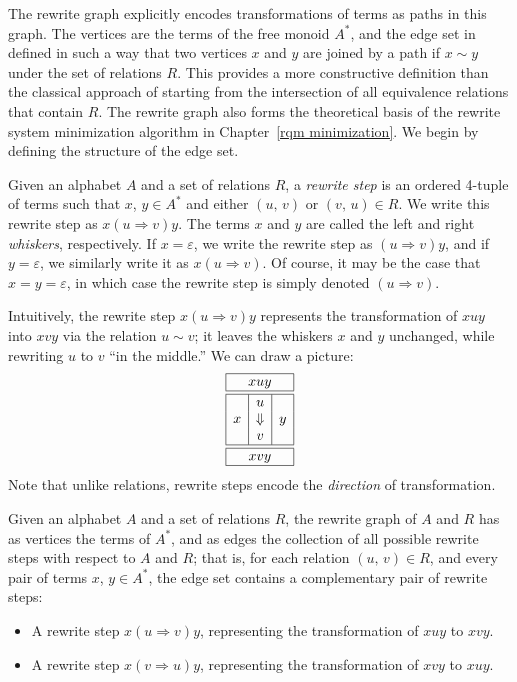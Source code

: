 \documentclass[../generics]{subfiles}
\begin{document}
The rewrite graph explicitly encodes transformations of terms as paths in this graph. The vertices are the terms of the free monoid $A^*$, and the edge set in defined in such a way that two vertices $x$ and $y$ are joined by a path if $x\sim y$ under the set of relations $R$. This provides a more constructive definition than the classical approach of starting from the intersection of all equivalence relations that contain $R$. The rewrite graph also forms the theoretical basis of the rewrite system minimization algorithm in Chapter~\ref{rqm minimization}. We begin by defining the structure of the edge set.

\begin{definition}
Given an alphabet $A$ and a set of relations $R$, a \emph{rewrite step} is an ordered 4-tuple of terms such that $x$, $y\in A^*$ and either $(u,\,v)$ or $(v,\,u)\in R$. We write this rewrite step as \index{$\Rightarrow$}$x(u\Rightarrow v)y$. The terms $x$ and $y$ are called the left and right \emph{whiskers}, respectively. If $x=\varepsilon$, we write the rewrite step as $(u\Rightarrow v)y$, and if $y=\varepsilon$, we similarly write it as $x(u\Rightarrow v)$. Of course, it may be the case that $x=y=\varepsilon$, in which case the rewrite step is simply denoted $(u\Rightarrow v)$.
\end{definition}
Intuitively, the rewrite step $x(u\Rightarrow v)y$ represents the transformation of $xuy$ into $xvy$ via the relation $u\sim v$; it leaves the whiskers $x$ and $y$ unchanged, while rewriting $u$ to $v$ ``in the middle.'' We can draw a picture:
\[
\begin{array}{|c|c|c|}
\hline
\multicolumn{3}{|c|}{xuy}\\
\hline
\hline
&u&\\
x&\Downarrow&y\\
&v&\\
\hline
\hline
\multicolumn{3}{|c|}{xvy}\\
\hline
\end{array}
\]
Note that unlike relations, rewrite steps encode the \emph{direction} of transformation.
\begin{definition}
Given an alphabet $A$ and a set of relations $R$, the rewrite graph of $A$ and $R$ has as vertices the terms of $A^*$, and as edges the collection of all possible rewrite steps with respect to $A$ and $R$; that is, for each relation $(u,\,v)\in R$, and every pair of terms $x$, $y\in A^*$, the edge set contains a complementary pair of rewrite steps:
\begin{itemize}
\item A rewrite step $x(u\Rightarrow v)y$, representing the transformation of $xuy$ to $xvy$.
\item A rewrite step $x(v\Rightarrow u)y$, representing the transformation of $xvy$ to $xuy$.
\end{itemize}
\end{definition}
\end{document}
